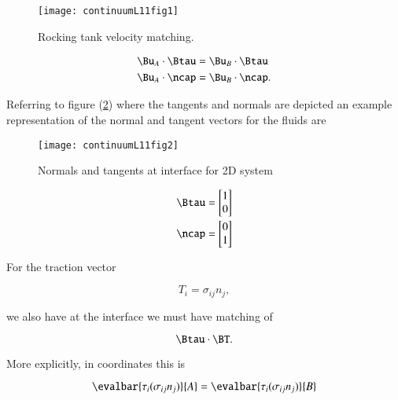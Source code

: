 \begin{figure}[htp]
   \centering
   \texttt{[image: continuumL11fig1]}
   \caption{Rocking tank velocity matching.}\label{fig:continuumL11:continuumL11fig1}
\end{figure}

\begin{align}\label{eqn:continuumL11:70}
\Bu_A \cdot \Btau &= \Bu_B \cdot \Btau \\
\Bu_A \cdot \ncap &= \Bu_B \cdot \ncap.
\end{align}

Referring to figure (\ref{fig:continuumL11:continuumL11fig2}) where the tangents and normals are depicted an example representation of the normal and tangent vectors for the fluids are

\begin{figure}[htp]
   \centering
   \texttt{[image: continuumL11fig2]}
   \caption{Normals and tangents at interface for 2D system}\label{fig:continuumL11:continuumL11fig2}
\end{figure}

\begin{align}\label{eqn:continuumL11:90}
\Btau &= 
\begin{bmatrix}
1 \\
0
\end{bmatrix} \\
\ncap &= 
\begin{bmatrix}
0 \\
1
\end{bmatrix} 
\end{align}

For the traction vector

\begin{equation}\label{eqn:continuumL11:110}
T_i = \sigma_{ij} n_j,
\end{equation}

we also have at the interface we must have matching of

\begin{equation}\label{eqn:continuumL11:130}
\Btau \cdot \BT.
\end{equation}

More explicitly, in coordinates this is

\begin{equation}\label{eqn:continuumL11:150}
\evalbar{\tau_i (\sigma_{ij} n_j)}{A} =
\evalbar{\tau_i (\sigma_{ij} n_j)}{B}
\end{equation}

